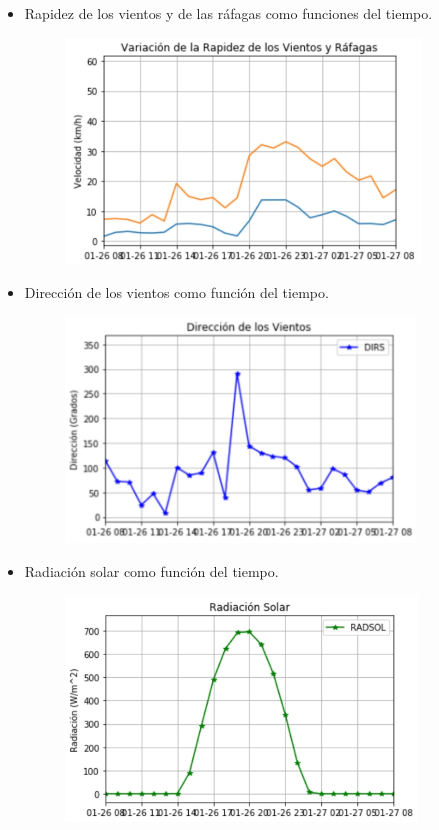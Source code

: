 \begin{itemize}
\item Rapidez de los vientos y de las ráfagas como funciones del tiempo.
\begin{figure}[h!]
\begin{center}
\includegraphics[height=6cm]{Vel}%
\end{center}
\end{figure}

\item Dirección de los vientos como función del tiempo.
\begin{figure}[h!]
\begin{center}
\includegraphics[height=6cm]{Dir}
\end{center}
\end{figure}

\item Radiación solar como función del tiempo.
\begin{figure}[h!]
\begin{center}
\includegraphics[height=6cm]{Rad}
\end{center}
\end{figure}

\end{itemize}

